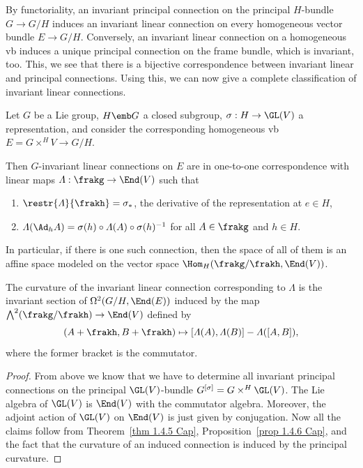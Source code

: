 By functoriality, an invariant principal connection on the principal $H$-bundle $G\to G\slash H$ induces an invariant linear connection on every homogeneous vector bundle $E\to G\slash H$. Conversely, an invariant linear connection on a homogeneous \gls{vb} induces a unique principal connection on the frame bundle, which is invariant, too. This, we see that there is a bijective correspondence between invariant linear and principal connections. Using this, we can now give a complete classification of invariant linear connections.

\begin{thm}\label{thm 1.4.7 Cap}
    Let $G$ be a Lie group, $H\emb G$ a closed subgroup, $\sigma:H\to \GL(V)$ a representation, and consider the corresponding homogeneous \gls{vb} $E=G\times^H V\to G\slash H$.

    Then $G$-invariant linear connections on $E$ are in one-to-one correspondence with linear maps $\varLambda:\frakg\to \End(V)$ such that 
    \begin{enumerate}[label=(\roman*)]
        \item $\restr{\varLambda}{\frakh}=\sigma_\ast$, the derivative of the representation at $e\in H$,
        \item $\varLambda(\Ad_h A)=\sigma(h)\circ\varLambda(A)\circ \sigma(h)^{-1}$ for all $A\in\frakg$ and $h\in H$.
    \end{enumerate}
    In particular, if there is one such connection, then the space of all of them is an affine space modeled on the vector space $\Hom_H(\frakg\slash\frakh,\End(V))$.

    The curvature of the invariant linear connection corresponding to $\varLambda$ is the invariant section of $\Omega^2(G\slash H,\End(E))$ induced by the map $\bigwedge^2(\frakg\slash\frakh)\to \End(V)$ defined by 
    \[(A+\frakh,B+\frakh)\mapsto [\varLambda(A),\varLambda(B)]-\varLambda([A,B]),\]
    where the former bracket is the commutator.
\end{thm}
\begin{proof}
    From above we know that we have to determine all invariant principal connections on the principal $\GL(V)$-bundle $G^{[\sigma]}=G\times^H \GL(V)$. The Lie algebra of $\GL(V)$ is $\End(V)$ with the commutator algebra. Moreover, the adjoint action of $\GL(V)$ on $\End(V)$ is just given by conjugation. Now all the claims follow from Theorem~\ref{thm 1.4.5 Cap}, Proposition~\ref{prop 1.4.6 Cap}, and the fact that the curvature of an induced connection is induced by the principal curvature.
\end{proof}


